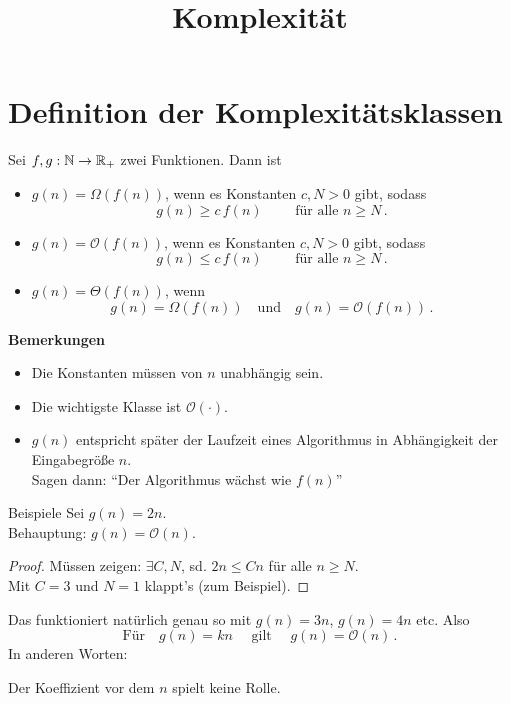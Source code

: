 \documentclass[aspectratio=169]{beamer}
\title{Komplexität}
\begin{document}
\begin{frame}[fragile]
  \maketitle
\end{frame}

\section{Definition der Komplexitätsklassen}
\begin{frame}[fragile]
  Sei $f,g : \mathbb{N} \rightarrow \mathbb{R}_{+}$ zwei Funktionen. Dann ist
  \pause
  \begin{itemize}
  \item $g(n) = \Omega(f(n))$, wenn es Konstanten $c, N > 0$ gibt, sodass
    \[
      g(n) \ge c\, f(n) \qquad \text{ für alle } n \ge N \,.
    \]
    \pause
  \item $g(n) = \mathcal{O}(f(n))$, wenn es Konstanten $c, N > 0$ gibt, sodass
    \[
      g(n) \le c\, f(n) \qquad \text{ für alle } n \ge N \,.
    \]
    \pause
  \item $g(n) = \Theta(f(n))$, wenn
    \[
      g(n) = \Omega(f(n)) \quad \text{und} \quad g(n) = \mathcal{O}(f(n)) \,.
    \]
  \end{itemize}
\end{frame}

\begin{frame}
  \textbf{Bemerkungen}
  \begin{itemize}
  \item Die Konstanten müssen von $n$ unabhängig sein.
  \item Die wichtigste Klasse ist $\mathcal{O}(\cdot)$.
  \item $g(n)$ entspricht später der Laufzeit eines Algorithmus in Abhängigkeit der Eingabegröße $n$.\\
    Sagen dann: ``Der Algorithmus wächst wie $f(n)$''
   \end{itemize}
\end{frame}

\begin{frame}{Beispiele}
  Sei $g(n) = 2n$.\\ Behauptung: $g(n) = \mathcal{O}(n)$.\\[2ex]
  \pause
  \begin{proof}
    Müssen zeigen: $\exists C, N$, sd. $2n \le Cn$ für alle $n \ge N$.\\[2ex]
    \pause
    Mit $C = 3$ und $N = 1$ klappt's (zum Beispiel).
  \end{proof}
  \pause
  Das funktioniert natürlich genau so mit $g(n) = 3n$, $g(n) = 4n$ etc. Also
  \[
    \text{Für} \quad g(n) = kn \quad \text{ gilt } \quad g(n) = \mathcal{O}(n)\,.
  \]
  In anderen Worten:
  \begin{center}
    Der Koeffizient vor dem $n$ spielt keine Rolle.
  \end{center}
\end{frame}
\end{document}
